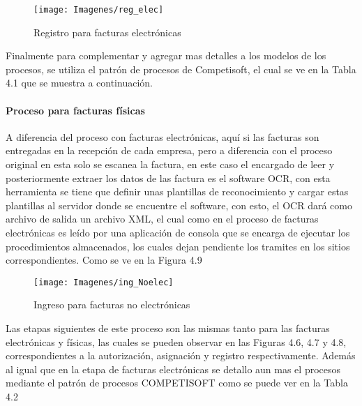 	\begin{figure}[H]
		\centering
		\texttt{[image: Imagenes/reg\_elec]}
		\caption{Registro para facturas electrónicas}
	\end{figure}
	
		Finalmente para complementar y agregar mas detalles a los modelos de los procesos, se utiliza el patrón de procesos de Competisoft, el cual se ve en la Tabla 4.1 que se muestra a continuación.
		
		
		
	
	\paragraph{Proceso para facturas físicas}
	 A diferencia del proceso con facturas electrónicas, aquí si las facturas son entregadas en la recepción de cada empresa, pero a diferencia con el proceso original en esta solo se escanea la factura, en este caso el encargado de leer y posteriormente extraer los datos de las factura es el software OCR, con esta herramienta se tiene que definir unas plantillas de reconocimiento y cargar estas plantillas al servidor donde se encuentre el software, con esto, el OCR dará como archivo de salida un archivo XML, el cual como en el proceso de facturas electrónicas es leído por una aplicación de consola que se encarga de ejecutar los procedimientos almacenados, los cuales dejan pendiente los tramites en los sitios correspondientes. Como se ve en la Figura 4.9
	 
	 	\begin{figure}[H]
	 		\centering
	 		\texttt{[image: Imagenes/ing\_Noelec]}
	 		\caption{Ingreso para facturas no electrónicas}
	 	\end{figure}
	 
	 Las etapas siguientes de este proceso son las mismas tanto para las facturas electrónicas y físicas, las cuales se pueden observar en las Figuras 4.6, 4.7 y 4.8, correspondientes a la autorización, asignación y registro respectivamente. Además al igual que en la etapa de facturas electrónicas se detallo aun mas el procesos mediante el patrón de procesos COMPETISOFT como se puede ver en la Tabla 4.2
	 
	 
	 